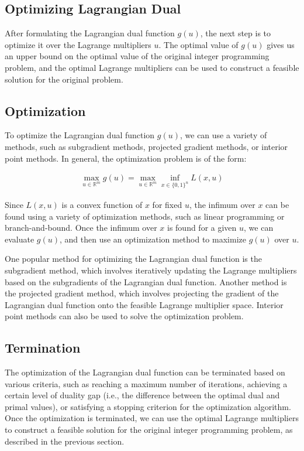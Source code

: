 
\subsection{Optimizing Lagrangian Dual}

After formulating the Lagrangian dual function $g(u)$, the next step is to optimize it over the Lagrange multipliers $u$. The optimal value of $g(u)$ gives us an upper bound on the optimal value of the original integer programming problem, and the optimal Lagrange multipliers can be used to construct a feasible solution for the original problem.

\subsection{Optimization}

To optimize the Lagrangian dual function $g(u)$, we can use a variety of methods, such as subgradient methods, projected gradient methods, or interior point methods. In general, the optimization problem is of the form:

\begin{align*}
\max_{u \in \mathbb{R}^m} g(u) = \max_{u \in \mathbb{R}^m} \inf_{x \in \{0,1\}^n} L(x,u)
\end{align*}

Since $L(x,u)$ is a convex function of $x$ for fixed $u$, the infimum over $x$ can be found using a variety of optimization methods, such as linear programming or branch-and-bound. Once the infimum over $x$ is found for a given $u$, we can evaluate $g(u)$, and then use an optimization method to maximize $g(u)$ over $u$.

One popular method for optimizing the Lagrangian dual function is the subgradient method, which involves iteratively updating the Lagrange multipliers based on the subgradients of the Lagrangian dual function. Another method is the projected gradient method, which involves projecting the gradient of the Lagrangian dual function onto the feasible Lagrange multiplier space. Interior point methods can also be used to solve the optimization problem.

\subsection{Termination}

The optimization of the Lagrangian dual function can be terminated based on various criteria, such as reaching a maximum number of iterations, achieving a certain level of duality gap (i.e., the difference between the optimal dual and primal values), or satisfying a stopping criterion for the optimization algorithm. Once the optimization is terminated, we can use the optimal Lagrange multipliers to construct a feasible solution for the original integer programming problem, as described in the previous section.

